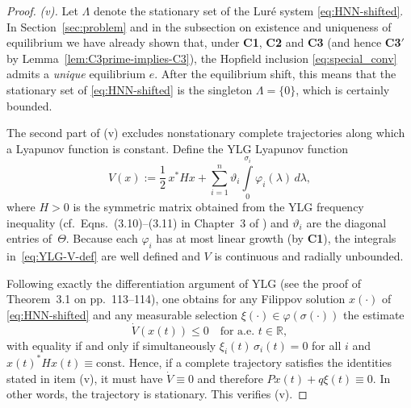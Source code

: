 \documentclass[journal]{IEEEtran}
\theoremstyle{myplain}
\begin{document}
\begin{proof}
\smallskip\noindent
\textit{(v).}
Let $\Lambda$ denote the stationary set of the Lur\'e system
\eqref{eq:HNN-shifted}.  In Section~\ref{sec:problem} and in the
subsection on existence and uniqueness of equilibrium we have already
shown that, under \textbf{C1}, \textbf{C2} and \textbf{C3}
(and hence \textbf{C3$'$} by Lemma~\ref{lem:C3prime-implies-C3}), the
Hopfield inclusion \eqref{eq:special_conv} admits a \emph{unique}
equilibrium $e$.  After the equilibrium shift, this means that the
stationary set of \eqref{eq:HNN-shifted} is the singleton
$\Lambda=\{0\}$, which is certainly bounded.

The second part of (v) excludes nonstationary complete trajectories
along which a Lyapunov function is constant.  Define the YLG
Lyapunov function
\begin{equation}\label{eq:YLG-V-def}
    V(x)
    := \frac12\,x^* H x + 
       \sum_{i=1}^n \vartheta_i
       \int\limits_0^{\sigma_i} \varphi_i(\lambda)\,d\lambda,
\end{equation}
where $H>0$ is the symmetric matrix obtained from the YLG
frequency inequality (cf.\ Eqns.~(3.10)–(3.11) in Chapter~3 of \cite{YLG})
and $\vartheta_i$ are the diagonal entries of~$\Theta$.  Because each
$\varphi_i$ has at most linear growth (by
\textbf{C1}), the integrals in~\eqref{eq:YLG-V-def} are well defined
and $V$ is continuous and radially unbounded.

Following exactly the differentiation argument of YLG (see the proof
of Theorem~3.1 on pp.~113–114), one obtains for any Filippov solution
$x(\cdot)$ of \eqref{eq:HNN-shifted} and any measurable selection
$\xi(\cdot)\in\varphi(\sigma(\cdot))$ the estimate
\[
  \dot V(x(t)) \le 0 \quad\text{for a.e. }t\in\mathbb{R},
\]
with equality if and only if simultaneously
$\xi_i(t)\,\sigma_i(t)=0$ for all $i$ and
$x(t)^* H x(t)\equiv\mathrm{const}$.  Hence, if a complete
trajectory satisfies the identities stated in item (v), it must have
$\dot V\equiv 0$ and therefore $Px(t)+q\xi(t)\equiv 0$.  In other
words, the trajectory is stationary.  This verifies (v).

\end{proof}
\end{document}
